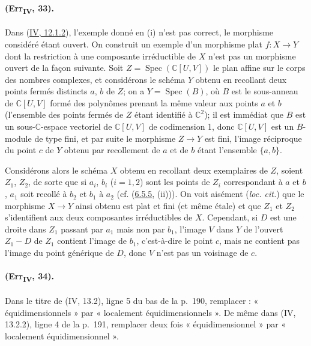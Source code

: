 \paragraph{(Err\textsubscript{IV}, 33).}
Dans ({\hyperref[canon-index.ega4.c04.item.12-1-2]{IV, 12.1.2}}), l'exemple donné
en (i) n'est pas correct, le morphisme considéré étant ouvert. On
construit un exemple d'un morphisme plat $f:X\to Y$ dont la restriction
à une composante irréductible de $X$ n'est pas un morphisme ouvert de
la façon suivante. Soit $Z=\operatorname{Spec}(\mathbb C[U,V])$ le
plan affine sur le corps des nombres complexes, et considérons le
schéma $Y$ obtenu en recollant deux points fermés distincts $a$, $b$ de
$Z$; on a $Y=\operatorname{Spec}(B)$, où $B$ est le sous-anneau de
$\mathbb C[U,V]$ formé des polynômes prenant la même valeur aux points
$a$ et $b$ (l'ensemble des points fermés de $Z$ étant identifié à
$\mathbb C^2$); il est immédiat que $B$ est un sous-$\mathbb C$-espace
vectoriel de $\mathbb C[U,V]$ de codimension 1, donc $\mathbb C[U,V]$
est un $B$-module de type fini, et par suite le morphisme $Z\to Y$ est
fini, l'image réciproque du point $c$ de $Y$ obtenu par recollement de
$a$ et de $b$ étant l'ensemble $\{a,b\}$.

Considérons alors le schéma $X$ obtenu en recollant deux exemplaires de
$Z$, soient $Z_1$, $Z_2$, de sorte que si $a_i$, $b_i$ ($i=1,2$) sont
les points de $Z_i$ correspondant à $a$ et $b$, $a_1$ soit recollé à
$b_2$ et $b_1$ à $a_2$ (cf. ({\hyperref[canon-index.ega4.c04.item.6-5-5]{6.5.5}},
(ii))). On voit aisément (\emph{loc. cit.}) que le morphisme $X\to Y$
ainsi obtenu est plat et fini (et même étale) et que $Z_1$ et $Z_2$
s'identifient aux deux composantes irréductibles de $X$. Cependant, si
$D$ est une droite dans $Z_1$ passant par $a_1$ mais non par $b_1$,
l'image $V$ dans $Y$ de l'ouvert $Z_1-D$ de $Z_1$ contient l'image de
$b_1$, c'est-à-dire le point $c$, mais ne contient pas l'image du point
générique de $D$, donc $V$ n'est pas un voisinage de $c$.

\paragraph{(Err\textsubscript{IV}, 34).}
Dans le titre de (IV, 13.2), ligne 5 du bas de la p.~190, remplacer :
« équidimensionnels » par « localement équidimensionnels ». De même
dans (IV, 13.2.2), ligne 4 de la p.~191, remplacer deux fois
« équidimensionnel » par « localement équidimensionnel ».

